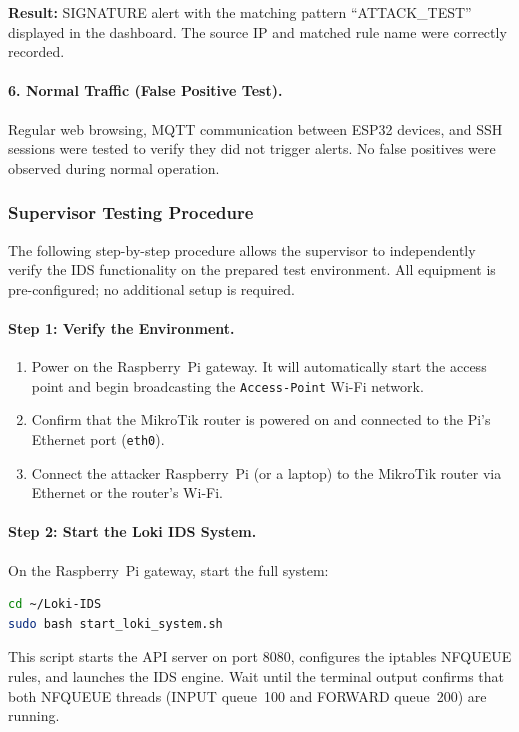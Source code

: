\documentclass[12pt,a4paper]{article}
\begin{document}
\textbf{Result:} SIGNATURE alert with the matching pattern ``ATTACK\_TEST'' displayed in the dashboard. The source IP and matched rule name were correctly recorded.

\paragraph{6. Normal Traffic (False Positive Test).}

Regular web browsing, MQTT communication between ESP32 devices, and SSH sessions were tested to verify they did not trigger alerts. No false positives were observed during normal operation.

\subsubsection{Supervisor Testing Procedure}
\label{sec:supervisor_testing}

The following step-by-step procedure allows the supervisor to independently verify the IDS functionality on the prepared test environment. All equipment is pre-configured; no additional setup is required.

\paragraph{Step 1: Verify the Environment.}
\begin{enumerate}
    \item Power on the Raspberry~Pi gateway. It will automatically start the access point and begin broadcasting the \texttt{Access-Point} Wi-Fi network.
    \item Confirm that the MikroTik router is powered on and connected to the Pi's Ethernet port (\texttt{eth0}).
    \item Connect the attacker Raspberry~Pi (or a laptop) to the MikroTik router via Ethernet or the router's Wi-Fi.
\end{enumerate}

\paragraph{Step 2: Start the Loki IDS System.}
On the Raspberry~Pi gateway, start the full system:
\begin{lstlisting}[language=bash]
cd ~/Loki-IDS
sudo bash start_loki_system.sh
\end{lstlisting}
This script starts the API server on port 8080, configures the iptables NFQUEUE rules, and launches the IDS engine. Wait until the terminal output confirms that both NFQUEUE threads (INPUT queue~100 and FORWARD queue~200) are running.
\end{document}
